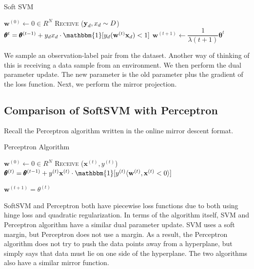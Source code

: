 \documentclass[11pt]{article}
\begin{document}
\begin{algorithm}[H]
\caption{Soft SVM}
\label{algo:SVM}
\begin{algorithmic}[1]
\STATE $\mathbf{w}^{(0)} \leftarrow 0 \in R^N$  \hfill
{}
\STATE \textsc{Receive} ($\textbf y_d, x_d \sim D$)  \hfill 
\STATE $\pmb{\theta}^t = \pmb{\theta}^{(t-1)} + y_d x_d \cdot \mathbbm{1}[y_d(\mathbf{w}^{(t)} \mathbf{x}_d) < 1]$  \hfill
\STATE $\mathbf{w}^{(t+1)}\leftarrow \dfrac{1}{\lambda (t+1)} \pmb{\theta}^t$  \hfill
\ENDFOR
\end{algorithmic}
\end{algorithm}

We sample an observation-label pair from the dataset. Another way of thinking of this is receiving a data sample from an environment. We then perform the dual parameter update. The new parameter is the old parameter plus the gradient of the loss function. Next, we perform the mirror projection.

\subsection{Comparison of SoftSVM with Perceptron}
Recall the Perceptron algorithm written in the online mirror descent format.
\begin{algorithm}[H]
\caption{Perceptron Algorithm}
\label{algo:Perceptrom}
\begin{algorithmic}[1]
\STATE $\textbf{w}^{(0)} \leftarrow 0 \in R^N$  \hfill
{}
\STATE \textsc{Receive} ($\mathbf{x}^{(t)}, y^{(t)}$) \hfill 
\STATE $\pmb{\theta}^{(t)} = \pmb{\theta}^{(t-1)} +y^{(t)} \mathbf{x}^{(t)} \cdot \mathbbm{1}[y^{(t)} \langle \mathbf{w}^{(t)}, \mathbf{x}^{(t)} < 0 \rangle] $ \hfill

\STATE $\mathbf{w}^{(t+1)} =  \theta^{(t)}$  \hfill 
\ENDFOR
\end{algorithmic}
\end{algorithm}

SoftSVM and Perceptron both have piecewise loss functions due to both using hinge loss and quadratic regularization. In terms of the algorithm itself, SVM and Perceptron algorithm have a similar dual parameter update. SVM uses a soft margin, but Perceptron does not use a margin. As a result, the Perceptron algorithm does not try to push the data points away from a hyperplane, but simply says that data must lie on one side of the hyperplane. The two algorithms also have a similar mirror function.
\end{document}

